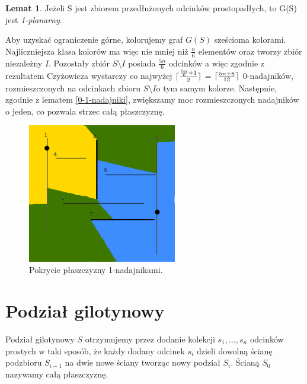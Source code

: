 \documentclass[brudnopis]{xmgr}
\DeclarePairedDelimiter\ceil{\lceil}{\rceil}
\theoremstyle{definition}
\newtheorem{Lemat}{Lemat}
\begin{document}
\begin{Lemat} \cite{knadajniki}
  Jeżeli S jest zbiorem przedłużonych odcinków prostopadłych, to G(S) jest \emph{1-planarny}.
\end{Lemat}

\indent Aby uzyskać ograniczenie górne, kolorujemy graf $G(S)$ sześcioma kolorami. Najliczniejsza klasa kolorów ma więc nie mniej niż $\frac{n}{6}$ elementów oraz tworzy zbiór niezależny $I$. Pozostały zbiór $S \setminus I$ posiada $\frac{5n}{6}$ odcinków a więc zgodnie z rezultatem Czyżowicza wystarczy co najwyżej $\ceil{\frac{\frac{5n}{6} + 1}{2}}$ = $\ceil{\frac{5n+6}{12}}$ 0-nadajników, rozmieszczonych na odcinkach zbioru $S \setminus I$o tym samym kolorze. Następnie, zgodnie z lematem \ref{0-1-nadajniki}, zwiększamy moc rozmieszczonych nadajników o jeden, co pozwala strzec całą płaszczyznę.
\begin{figure}[ht!]
  \centering
  \includegraphics[width=6.5cm]{rysunki/pokrycie_nadajnikami.png}
  \caption{Pokrycie płaszczyzny 1-nadajnikami.}
  \label{fig:pokrycie plaszczyzny}
\end{figure} 

\section{Podział gilotynowy}
Podział gilotynowy $S$ otrzymujemy przez dodanie kolekcji $s_1,\ldots,s_n$ odcinków prostych w taki sposób, że każdy dodany odcinek $s_i$ dzieli dowolną ścianę podzbioru $S_{i-1}$ na dwie nowe ściany tworząc nowy podział $S_i$. Ścianą $S_0$ nazywamy całą płaszczyznę.
\end{document}
